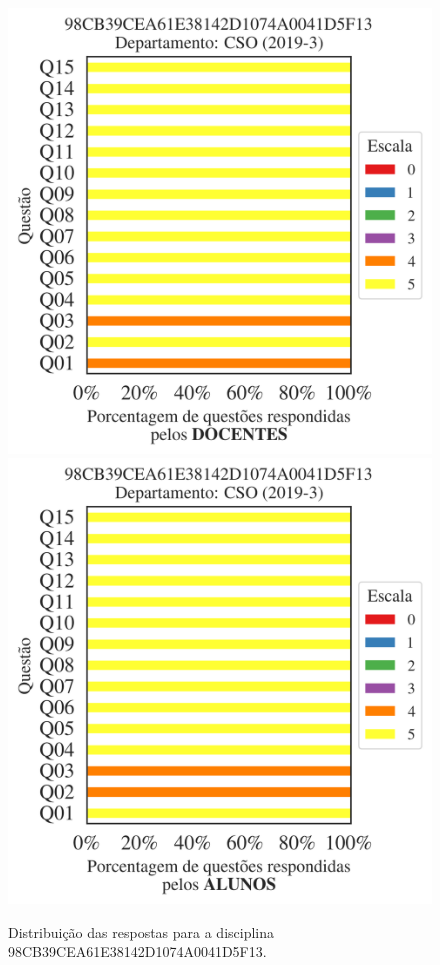 \documentclass[a4paper,10pt]{article}
\begin{document}
\begin{figure}[h]
\centering
\includegraphics[width=0.485\linewidth]{analise_disciplina_departamento_CSO_98CB39CEA61E38142D1074A0041D5F13_docentes.png}
\includegraphics[width=0.485\linewidth]{analise_disciplina_departamento_CSO_98CB39CEA61E38142D1074A0041D5F13_alunos.png}
\caption{\label{fig:analise_geral_departamento}                Distribuição das respostas para a disciplina 98CB39CEA61E38142D1074A0041D5F13. }
\end{figure}
\end{document}

